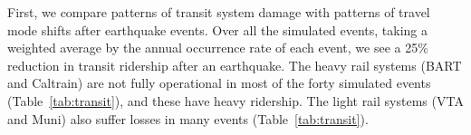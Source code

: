 First, we compare patterns of transit system damage with patterns of travel mode shifts after earthquake events. Over all the simulated events, taking a weighted average by the annual occurrence rate of each event, we see a 25\% reduction in transit ridership after an earthquake. The heavy rail systems (BART and Caltrain) are not fully operational in most of the forty simulated events (Table~\ref{tab:transit}), and these have heavy ridership. The light rail systems (VTA and Muni) also suffer losses in many events (Table~\ref{tab:transit}). %
